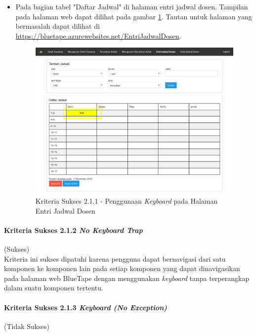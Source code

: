 \documentclass[a4paper,twoside]{article}
\begin{document}
\begin{enumerate}
\begin{itemize}
			\item Pada bagian tabel "Daftar Jadwal" di halaman entri jadwal dosen. Tampilan pada halaman web dapat dilihat pada gambar \ref{fig:2.1.1_keyboard_2}. Tautan untuk halaman yang bermasalah dapat dilihat di \url{https://bluetape.azurewebsites.net/EntriJadwalDosen}.
			\begin{figure}[H]
				\centering  
				\includegraphics[scale=0.3, frame]{kriteria-sukses-2-1-1-keyboard-2}  
				\caption[Kriteria Sukses 2.1.1 - Penggunaan \textit{Keyboard} pada Halaman Entri Jadwal Dosen]{Kriteria Sukses 2.1.1 - Penggunaan \textit{Keyboard} pada Halaman Entri Jadwal Dosen}
				\label{fig:2.1.1_keyboard_2}  
			\end{figure} 
		\end{itemize}

		\paragraph{Kriteria Sukses 2.1.2 \textit{No Keyboard Trap}}
		\label{par:kepatuhan_bluetape_kriteria_sukses_2.1.2}
		(Sukses)\\

		Kriteria ini sukses dipatuhi karena pengguna dapat bernavigasi dari satu komponen ke komponen lain pada setiap komponen yang dapat dinavigasikan pada halaman web BlueTape dengan menggunakan \textit{keyboard} tanpa terperangkap dalam suatu komponen tertentu.

		\paragraph{Kriteria Sukses 2.1.3 \textit{Keyboard (No Exception)}}
		\label{par:kepatuhan_bluetape_kriteria_sukses_2.1.3}
		(Tidak Sukses)\\


\end{enumerate}
\end{document}

